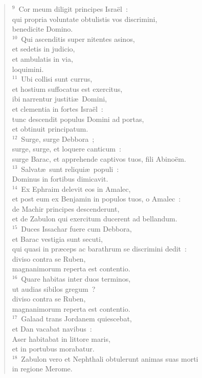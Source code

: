 \begin{verse}${}^{9}$~Cor meum diligit principes Isra\"el~:\\ qui propria voluntate obtulistis vos discrimini,\\ benedicite Domino.\\
${}^{10}$~Qui ascenditis super nitentes asinos,\\ et sedetis in judicio,\\ et ambulatis in via,\\ loquimini.\\
${}^{11}$~Ubi collisi sunt currus,\\ et hostium suffocatus est exercitus,\\ ibi narrentur justiti\ae\ Domini,\\ et clementia in fortes Isra\"el~:\\ tunc descendit populus Domini ad portas,\\ et obtinuit principatum.\\
${}^{12}$~Surge, surge Debbora~;\\ surge, surge, et loquere canticum~:\\ surge Barac, et apprehende captivos tuos, fili Abino\"em.\\
${}^{13}$~Salvat\ae\ sunt reliqui\ae\ populi~:\\ Dominus in fortibus dimicavit.\\
${}^{14}$~Ex Ephraim delevit eos in Amalec,\\ et post eum ex Benjamin in populos tuos, o Amalec~:\\ de Machir principes descenderunt,\\ et de Zabulon qui exercitum ducerent ad bellandum.\\
${}^{15}$~Duces Issachar fuere cum Debbora,\\ et Barac vestigia sunt secuti,\\ qui quasi in pr\ae ceps ac barathrum se discrimini dedit~:\\ diviso contra se Ruben,\\ magnanimorum reperta est contentio.\\
${}^{16}$~Quare habitas inter duos terminos,\\ ut audias sibilos gregum~?\\ diviso contra se Ruben,\\ magnanimorum reperta est contentio.\\
${}^{17}$~Galaad trans Jordanem quiescebat,\\ et Dan vacabat navibus~:\\ Aser habitabat in littore maris,\\ et in portubus morabatur.\\
${}^{18}$~Zabulon vero et Nephthali obtulerunt animas suas morti\\ in regione Merome.\end{verse}



